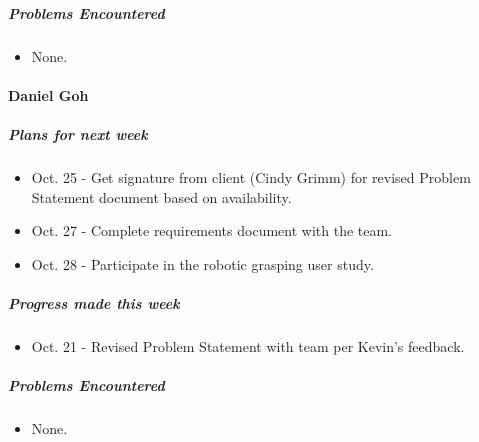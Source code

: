 {\subparagraph{Problems Encountered}
\begin{itemize}
  \item None.
\end{itemize}

\vspace{3mm}
\paragraph{Daniel Goh}
\subparagraph{Plans for next week}
\begin{itemize}
  \item Oct. 25 - Get signature from client (Cindy Grimm) for revised Problem Statement document based on availability.
  \item Oct. 27 - Complete requirements document with the team.
  \item Oct. 28 - Participate in the robotic grasping user study.
\end{itemize}

\subparagraph{Progress made this week}
\begin{itemize}
  \item Oct. 21 - Revised Problem Statement with team per Kevin's feedback.
\end{itemize}

\subparagraph{Problems Encountered}
\begin{itemize}
  \item None.
\end{itemize}

}

\newpage

